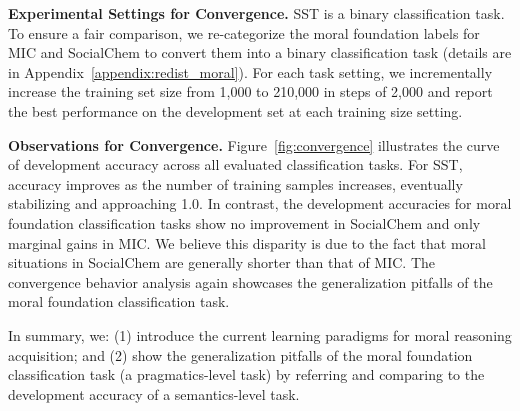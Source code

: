 \textbf{Experimental Settings for Convergence.} 
SST is a binary classification task. To ensure a fair comparison, we re-categorize the moral foundation labels for MIC and SocialChem to convert them into a binary classification task (details are in Appendix~\ref{appendix:redist_moral}).
For each task setting, we incrementally increase the training set size from 1,000 to 210,000 in steps of 2,000 and report the best performance on the development set at each training size setting.


\textbf{Observations for Convergence.} Figure~\ref{fig:convergence} illustrates the curve of development accuracy across all evaluated classification tasks. 
For SST, accuracy improves as the number of training samples increases, eventually stabilizing and approaching 1.0.
In contrast, the development accuracies for moral foundation classification tasks show no improvement in SocialChem and only marginal gains in MIC.
We believe this disparity is due to the fact that moral situations in SocialChem are generally shorter than that of MIC.
The convergence behavior analysis again showcases the generalization pitfalls of the moral foundation classification task.

In summary, we: (1) introduce the current learning paradigms for moral reasoning acquisition; and (2) show the generalization pitfalls of the moral foundation classification task (a pragmatics-level task) by referring and comparing to the development accuracy of a semantics-level task.